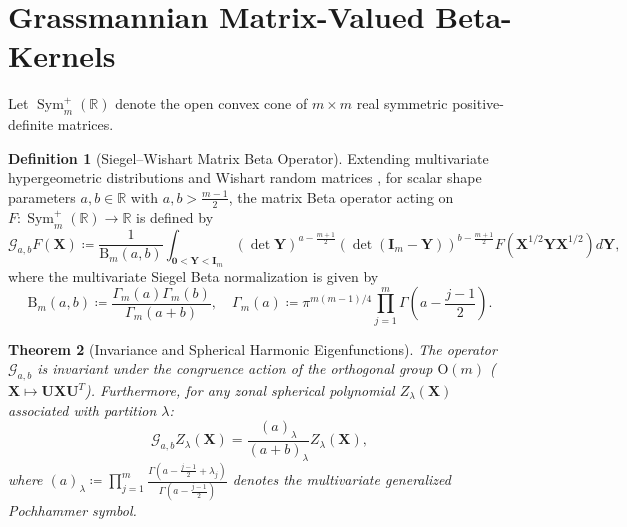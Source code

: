 \documentclass[11pt,a4paper]{article}
\theoremstyle{plain}
\newtheorem{theorem}{Theorem}[section]
\theoremstyle{definition}
\newtheorem{definition}[theorem]{Definition}
\theoremstyle{remark}
\numberwithin{equation}{section}
\begin{document}
\section{Grassmannian Matrix-Valued Beta-Kernels}

Let $\operatorname{Sym}_m^+(\mathbb{R})$ denote the open convex cone of $m \times m$ real symmetric positive-definite matrices.

\begin{definition}[Siegel--Wishart Matrix Beta Operator]
Extending multivariate hypergeometric distributions and Wishart random matrices \cite{muirhead2009}, for scalar shape parameters $a, b \in \mathbb{R}$ with $a, b > \frac{m-1}{2}$, the matrix Beta operator acting on $F: \operatorname{Sym}_m^+(\mathbb{R}) \to \mathbb{R}$ is defined by
\begin{equation}
\mathcal{G}_{a, b} F(\mathbf{X}) \coloneqq \frac{1}{\mathrm{B}_m(a, b)} \int_{\mathbf{0} < \mathbf{Y} < \mathbf{I}_m} (\det \mathbf{Y})^{a - \frac{m+1}{2}} (\det(\mathbf{I}_m - \mathbf{Y}))^{b - \frac{m+1}{2}} F\left(\mathbf{X}^{1/2} \mathbf{Y} \mathbf{X}^{1/2}\right) d\mathbf{Y},
\end{equation}
where the multivariate Siegel Beta normalization is given by
\begin{equation}
\mathrm{B}_m(a, b) \coloneqq \frac{\Gamma_m(a)\Gamma_m(b)}{\Gamma_m(a+b)}, \quad \Gamma_m(a) \coloneqq \pi^{m(m-1)/4}\prod_{j=1}^m \Gamma\left(a - \frac{j-1}{2}\right).
\end{equation}
\end{definition}

\begin{theorem}[Invariance and Spherical Harmonic Eigenfunctions]
The operator $\mathcal{G}_{a, b}$ is invariant under the congruence action of the orthogonal group $\mathrm{O}(m)$ ($\mathbf{X} \mapsto \mathbf{U}\mathbf{X}\mathbf{U}^T$). Furthermore, for any zonal spherical polynomial $Z_\lambda(\mathbf{X})$ associated with partition $\lambda$:
\begin{equation}
\mathcal{G}_{a, b} Z_\lambda(\mathbf{X}) = \frac{(a)_\lambda}{(a+b)_\lambda} Z_\lambda(\mathbf{X}),
\end{equation}
where $(a)_\lambda \coloneqq \prod_{j=1}^m \frac{\Gamma\left(a - \frac{j-1}{2} + \lambda_j\right)}{\Gamma\left(a - \frac{j-1}{2}\right)}$ denotes the multivariate generalized Pochhammer symbol.
\end{theorem}
\end{document}
